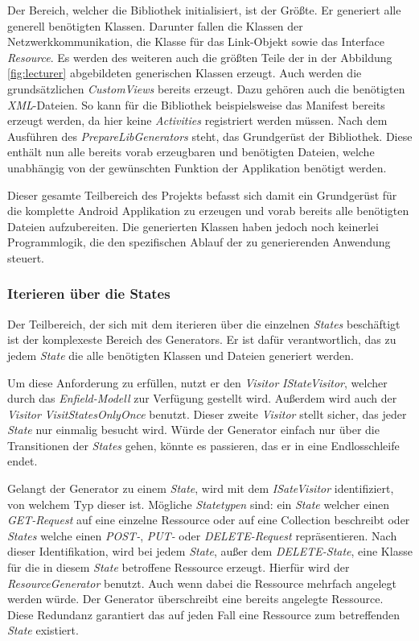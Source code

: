 Der Bereich, welcher die Bibliothek initialisiert, ist der Größte. Er generiert alle generell benötigten Klassen. Darunter fallen die Klassen der Netzwerkkommunikation, die Klasse für das Link-Objekt sowie das Interface \textit{Resource}. Es werden des weiteren auch die größten Teile der in der Abbildung \ref{fig:lecturer} abgebildeten generischen Klassen erzeugt. Auch werden die grundsätzlichen \textit{CustomViews} bereits erzeugt. Dazu gehören auch die benötigten \textit{XML}-Dateien. So kann für die Bibliothek beispielsweise das Manifest bereits erzeugt werden, da hier keine \textit{Activities} registriert werden müssen. Nach dem Ausführen des \textit{PrepareLibGenerators} steht, das Grundgerüst der Bibliothek. Diese enthält nun alle bereits vorab erzeugbaren und benötigten Dateien, welche unabhängig von der gewünschten Funktion der Applikation benötigt werden. 

Dieser gesamte Teilbereich des Projekts befasst sich damit ein Grundgerüst für die komplette Android Applikation zu erzeugen und vorab bereits alle benötigten Dateien aufzubereiten. Die generierten Klassen haben jedoch noch keinerlei Programmlogik, die den spezifischen Ablauf der zu generierenden Anwendung steuert.

\subsubsection{Iterieren über die States}

Der Teilbereich, der sich mit dem iterieren über die einzelnen \textit{States} beschäftigt ist der komplexeste Bereich des Generators. Er ist dafür verantwortlich, das zu jedem \textit{State} die alle benötigten Klassen und Dateien generiert werden. 

Um diese Anforderung zu erfüllen, nutzt er den \textit{Visitor} \textit{IStateVisitor}, welcher durch das \textit{Enfield-Modell} zur Verfügung gestellt wird. Außerdem wird auch der \textit{Visitor} \textit{VisitStatesOnlyOnce} benutzt. Dieser zweite \textit{Visitor} stellt sicher, das jeder \textit{State} nur einmalig besucht wird. Würde der Generator einfach nur über die Transitionen der \textit{States} gehen, könnte es passieren, das er in eine Endlosschleife endet.

Gelangt der Generator zu einem \textit{State}, wird mit dem \textit{ISateVisitor} identifiziert, von welchem Typ dieser ist. Mögliche \textit{Statetypen} sind: ein \textit{State} welcher einen \textit{GET-Request} auf eine einzelne Ressource oder auf eine Collection beschreibt oder \textit{States} welche einen \textit{POST-}, \textit{PUT-} oder \textit{DELETE-Request} repräsentieren.  Nach dieser Identifikation, wird bei jedem \textit{State}, außer dem \textit{DELETE-State}, eine Klasse für die in diesem \textit{State} betroffene Ressource erzeugt. Hierfür wird der \textit{ResourceGenerator} benutzt. Auch wenn dabei die Ressource mehrfach angelegt werden würde. Der Generator überschreibt eine bereits angelegte Ressource. Diese Redundanz garantiert das auf jeden Fall eine Ressource zum betreffenden \textit{State} existiert. 

